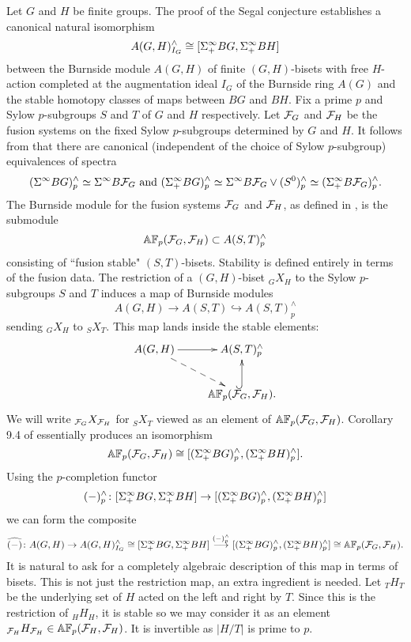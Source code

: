 \documentclass[10pt]{amsart}
\theoremstyle{definition}
\begin{document}
Let $G$ and $H$ be finite groups. The proof of the Segal conjecture establishes a canonical natural isomorphism
\[
A(G,H)^{\wedge}_{I_G} \cong [\Sigma^{\infty}_{+} BG, \Sigma^{\infty}_{+} BH]
\]
between the Burnside module $A(G,H)$ of finite $(G,H)$-bisets with free $H$-action completed at the augmentation ideal $I_G$ of the Burnside ring $A(G)$ and the stable homotopy classes of maps between $BG$ and $BH$. Fix a prime $p$ and Sylow $p$-subgroups $S$ and $T$ of $G$ and $H$ respectively. Let $\mathcal{F}_G$ and $\mathcal{F}_H$ be the fusion systems on the fixed Sylow $p$-subgroups determined by $G$ and $H$. It follows from \cite{BLO2} that there are canonical (independent of the choice of Sylow $p$-subgroup) equivalences of spectra
\[
(\Sigma^{\infty} BG)^{\wedge}_p \simeq \Sigma^{\infty} B\mathcal{F}_G \text{ and } (\Sigma^{\infty}_{+} BG)^{\wedge}_p \simeq \Sigma^{\infty} B\mathcal{F}_G \vee (S^0)^{\wedge}_{p} \simeq (\Sigma^{\infty}_{+} B\mathcal{F}_G)^{\wedge}_{p}.
\]
The Burnside module for the fusion systems $\mathcal{F}_G$ and $\mathcal{F}_H$, as defined in \cite{Ragnarsson}, is the submodule
\[
\mathbb{A} \mathbb{F}_p(\mathcal{F}_G, \mathcal{F}_H) \subset A(S,T)^{\wedge}_{p}
\]
consisting of ``fusion stable" $(S,T)$-bisets. Stability is defined entirely in terms of the fusion data. The restriction of a $(G,H)$-biset ${}_{G}X_{H}$ to the Sylow $p$-subgroups $S$ and $T$ induces a map of Burnside modules
\[
A(G,H) \rightarrow A(S,T) \hookrightarrow A(S,T)^{\wedge}_{p}
\]
sending ${}_{G}X_{H}$ to ${}_{S}X_{T}$. This map lands inside the stable elements:
\[
\xymatrix{A(G,H) \ar[r] \ar@{-->}[dr] & A(S,T)^{\wedge}_{p} \\ & \AF(\cF_G,\cF_H). \ar@{^{(}->}[u]}
\]
We will write ${}_{\mathcal{F}_G}X_{\mathcal{F}_H}$ for ${}_{S}X_{T}$ viewed as an element of $\mathbb{A} \mathbb{F}_p(\mathcal{F}_G,\mathcal{F}_H)$. Corollary 9.4 of \cite{RagnarssonStancu} essentially produces an isomorphism
\[
\mathbb{A} \mathbb{F}_p(\mathcal{F}_G, \mathcal{F}_H) \cong [(\Sigma^{\infty}_{+} BG)^{\wedge}_{p}, (\Sigma^{\infty}_{+} BH)^{\wedge}_{p}].
\]
Using the $p$-completion functor
\[
(-)^{\wedge}_{p} \colon [\Sigma^{\infty}_{+} BG, \Sigma^{\infty}_{+} BH] \rightarrow [(\Sigma^{\infty}_{+} BG)^{\wedge}_{p}, (\Sigma^{\infty}_{+} BH)^{\wedge}_{p}]
\]
we can form the composite
\[
\widehat{(-)} \colon A(G,H) \rightarrow A(G,H)^{\wedge}_{I_G} \cong [\Sigma^{\infty}_{+} BG, \Sigma^{\infty}_{+} BH] \overset{(-)^{\wedge}_{p}}{\longrightarrow} [(\Sigma^{\infty}_{+} BG)^{\wedge}_{p}, (\Sigma^{\infty}_{+} BH)^{\wedge}_{p}] \cong \mathbb{A} \mathbb{F}_p(\mathcal{F}_G, \mathcal{F}_H).
\]
It is natural to ask for a completely algebraic description of this map in terms of bisets. This is not just the restriction map, an extra ingredient is needed. Let $_{T}H_{T}$ be the underlying set of $H$ acted on the left and right by $T$. Since this is the restriction of $_{H}H_{H}$, it is stable so we may consider it as an element $_{\mathcal{F}_H}H_{\mathcal{F}_H} \in \mathbb{A} \mathbb{F}_p(\mathcal{F}_H,\mathcal{F}_H)$.  It is invertible as $|H/T|$ is prime to $p$.
\end{document}
